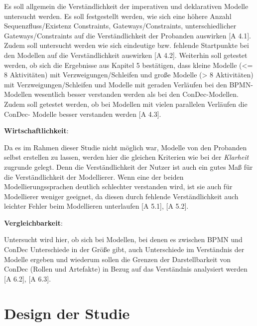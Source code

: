 Es soll allgemein die Verständlichkeit der imperativen und deklarativen Modelle untersucht werden. Es soll festgestellt werden, wie sich eine höhere Anzahl Sequenzfluss/Existenz Constraints, Gateways/Constraints,  unterschiedlicher Gateways/Constraints auf die Verständlichkeit der Probanden auswirken [A 4.1].\newline
Zudem soll untersucht werden wie sich eindeutige bzw. fehlende Startpunkte bei den Modellen auf die Verständlichkeit auswirken [A 4.2].
Weiterhin soll getestet werden, ob sich die Ergebnisse aus Kapitel 5 bestätigen, dass kleine Modelle (<= 8 Aktivitäten) mit Verzweigungen/Schleifen und große Modelle (> 8 Aktivitäten) mit Verzweigungen/Schleifen und Modelle mit geraden Verläufen bei den BPMN-Modellen wesentlich besser verstanden werden als bei den ConDec-Modellen.\newline
Zudem soll getestet werden, ob bei Modellen mit vielen parallelen Verläufen die ConDec- Modelle besser verstanden werden [A 4.3].\newline

\textbf{Wirtschaftlichkeit}: 

Da es im Rahmen dieser Studie nicht möglich war, Modelle von den Probanden selbst erstellen zu lassen, werden hier die gleichen Kriterien wie bei der \textit{Klarheit} zugrunde gelegt. Denn die Verständlichkeit der Nutzer ist auch ein gutes Maß für die Verständlichkeit der Modellierer. Wenn eine der beiden Modellierungssprachen deutlich schlechter verstanden wird, ist sie auch für Modellierer weniger geeignet, da diesen durch fehlende Verständlichkeit auch leichter Fehler beim Modellieren unterlaufen [A 5.1], [A 5.2].\newline

\textbf{Vergleichbarkeit}: 

Untersucht wird hier, ob sich bei Modellen, bei denen es zwischen BPMN und ConDec Unterschiede in der Größe gibt, auch Unterschiede im Verständnis der Modelle ergeben und wiederum sollen die Grenzen der Darstellbarkeit von ConDec (Rollen und Artefakte) in Bezug auf das Verständnis analysiert werden [A 6.2], [A 6.3].\newline

\section{Design der Studie}

